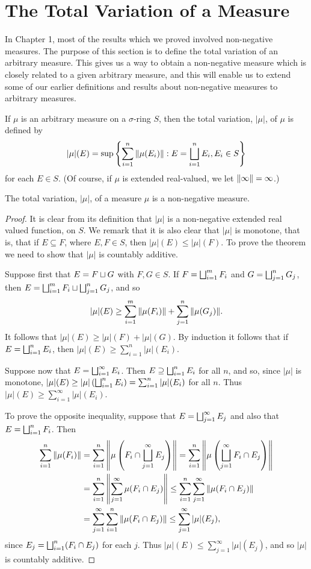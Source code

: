 \section{The Total Variation of a Measure}

In Chapter 1, most of the results which we proved involved non-negative measures. The purpose of this section is to define the total variation of an arbitrary measure. This gives us a way to obtain a non-negative measure which is closely related to a given arbitrary measure, and this will enable us to extend some of our earlier definitions and results about non-negative measures to arbitrary measures.

\begin{definition}
If $\mu$ is an arbitrary measure on a $\sigma$-ring $S$, then the total variation, $|\mu|$, of $\mu$ is defined by $$|\mu|(E)=\sup \left\{\sum_{i=1}^n\norm{\mu(E_i)}: E=\bigsqcup_{i=1}^nE_i, E_i\in S\right\}$$ for each $E \in S$. (Of course, if $\mu$ is extended real-valued, we let $\norm{\infty}=\infty$.)
\end{definition}


\begin{theorem}
The total variation, $|\mu|$, of a measure $\mu$ is a non-negative measure.
\end{theorem}

\begin{proof}
It is clear from its definition that $|\mu|$ is a non-negative extended real valued function, on $S$. We remark that it is also clear that $|\mu|$ is monotone, that is, that if $E \subseteq F$, where $E, F \in S$, then $|\mu|(E)\leq|\mu|(F)$. To prove the theorem we need to show that $|\mu|$ is countably additive.

Suppose first that $E=F\sqcup G$ with $F,G\in S$. If $F=\bigsqcup_{i=1}^mF_i$ and $G=\bigsqcup_{j=1}^nG_j$, then $E=\bigsqcup_{i=1}^mF_i\sqcup\bigsqcup_{j=1}^nG_j$, and so $$|\mu|(E)\geq\sum_{i=1}^m\norm{\mu(F_i)}+\sum_{j=1}^n\norm{\mu(G_j)}.$$ It follows that $|\mu|(E)\geq|\mu|(F)+|\mu|(G)$. By induction it follows that if $E=\bigsqcup_{i=1}^nE_i$, then $|\mu|(E)\geq\sum_{i=1}^n|\mu|(E_i)$.

Suppose now that $E=\bigsqcup_{i=1}^\infty E_i$. Then $E\supseteq\bigsqcup_{i=1}^nE_i$ for all $n$, and so, since $|\mu|$ is monotone, $|\mu|(E)\geq|\mu|\left(\bigsqcup_{i=1}^nE_i\right)=\sum_{i=1}^n|\mu|(E_i)$ for all $n$. Thus $|\mu|(E)\geq\sum_{i=1}^\infty|\mu|(E_i)$.

To prove the opposite inequality, suppose that $E=\bigsqcup_{j=1}^\infty E_j$ and also that $E=\bigsqcup_{i=1}^nF_i$. Then
\begin{align*}
    \sum_{i=1}^n\norm{\mu(F_i)}&=\sum_{i=1}^n\norm{\mu\left(F_i\cap\bigsqcup_{j=1}^\infty E_j\right)}=\sum_{i=1}^n\norm{\mu\left(\bigsqcup_{j=1}^\infty F_i\cap E_j\right)}\\
    &=\sum_{i=1}^n\norm{\sum_{j=1}^\infty\mu(F_i\cap E_j)}\leq\sum_{i=1}^n\sum_{j=1}^\infty\norm{\mu(F_i\cap E_j)}\\
    &=\sum_{j=1}^\infty\sum_{i=1}^n\norm{\mu(F_i\cap E_j)}\leq\sum_{j=1}^\infty|\mu|(E_j),
\end{align*}
since $E_j=\bigsqcup_{i=1}^n(F_i\cap E_j)$ for each $j$. Thus $|\mu|(E)\leq\sum_{j=1}^\infty|\mu|(E_j)$, and so $|\mu|$ is countably additive.
\end{proof}

